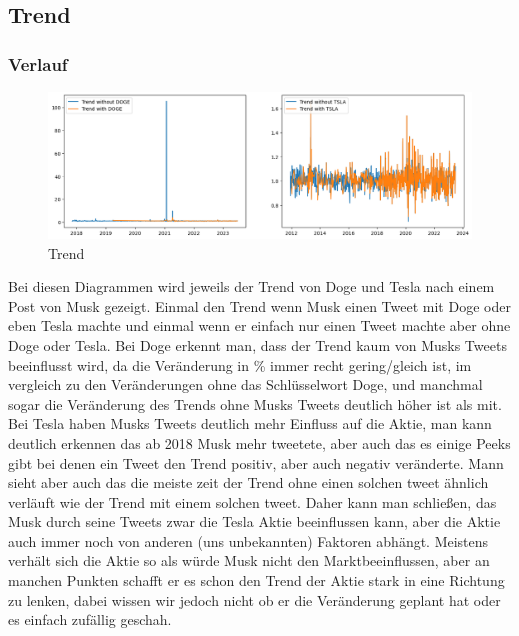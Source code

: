 \documentclass{article}
\begin{document}
\newpage



\subsection{Trend}
\subsubsection{Verlauf}
\begin{figure}[!htb]
  	\includegraphics[width=\textwidth, center]{../imgs/Trend.png}
 	\caption{Trend}
 	\label{fig:Trend}
\end{figure}
Bei diesen Diagrammen wird jeweils der Trend von Doge und Tesla nach einem Post von Musk gezeigt. Einmal den Trend wenn Musk einen Tweet mit Doge oder eben Tesla machte und einmal wenn er einfach nur einen Tweet machte aber ohne Doge oder Tesla. Bei Doge erkennt man, dass der Trend kaum von Musks Tweets beeinflusst wird, da die Veränderung in \% immer recht gering/gleich ist, im vergleich zu den Veränderungen ohne das
Schlüsselwort Doge, und manchmal sogar die Veränderung des Trends ohne Musks Tweets deutlich höher ist als mit. Bei Tesla haben Musks Tweets deutlich mehr Einfluss auf die Aktie, man kann deutlich erkennen das ab 2018 Musk mehr tweetete, aber auch das es einige Peeks gibt bei denen ein Tweet den Trend positiv, aber auch negativ veränderte. Mann sieht aber auch das die meiste zeit der Trend ohne einen solchen tweet ähnlich verläuft wie der Trend mit einem solchen tweet. Daher kann man schließen, das Musk durch seine Tweets zwar die Tesla Aktie beeinflussen kann, aber die Aktie auch immer noch von anderen (uns unbekannten) Faktoren abhängt. Meistens verhält sich die Aktie so als würde Musk nicht den Marktbeeinflussen, aber an manchen Punkten schafft er es schon den Trend der Aktie stark in eine Richtung zu lenken, dabei wissen wir jedoch nicht ob er die Veränderung geplant hat oder es einfach zufällig geschah.
\end{document}
